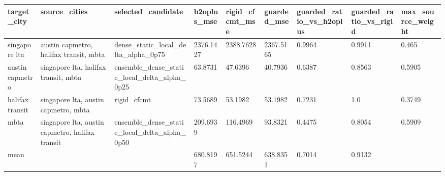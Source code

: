 \begin{tabular}{lllllllll}
\toprule
target\_city & source\_cities & selected\_candidate & h2oplus\_mse & rigid\_cfcmt\_mse & guarded\_mse & guarded\_ratio\_vs\_h2oplus & guarded\_ratio\_vs\_rigid & max\_source\_weight \\
\midrule
singapore lta & austin capmetro, halifax transit, mbta & dense\_static\_local\_delta\_alpha\_0p75 & 2376.1427 & 2388.7628 & 2367.5165 & 0.9964 & 0.9911 & 0.465 \\
austin capmetro & singapore lta, halifax transit, mbta & ensemble\_dense\_static\_local\_delta\_alpha\_0p25 & 63.8731 & 47.6396 & 40.7936 & 0.6387 & 0.8563 & 0.5905 \\
halifax transit & singapore lta, austin capmetro, mbta & rigid\_cfcmt & 73.5689 & 53.1982 & 53.1982 & 0.7231 & 1.0 & 0.3749 \\
mbta & singapore lta, austin capmetro, halifax transit & ensemble\_dense\_static\_local\_delta\_alpha\_0p50 & 209.6939 & 116.4969 & 93.8321 & 0.4475 & 0.8054 & 0.5909 \\
mean &  &  & 680.8197 & 651.5244 & 638.8351 & 0.7014 & 0.9132 &  \\
\bottomrule
\end{tabular}
